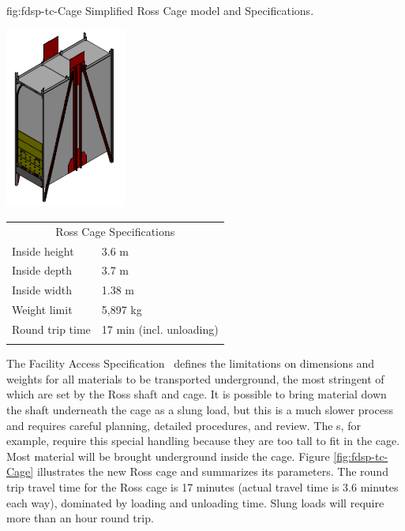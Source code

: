\begin{dunefigure}
{fig:fdsp-tc-Cage}
{Simplified Ross Cage model and Specifications.}
\parbox{2.1in}{\includegraphics[width=0.3\textwidth]{graphics/Cage-view.pdf}}
\qquad\hspace{10pt}
\begin{minipage}{0.5\textwidth}%
\begin{tabular}{p{3.4cm}p{3.4cm}}        
\multicolumn{2}{c}{Ross Cage Specifications}\\ \toprowrule
Inside height & 3.6 m\\ \colhline
Inside depth  & 3.7 m \\ \colhline
Inside width  & 1.38 m \\ \colhline
Weight limit  &  5,897 kg \\ \colhline
Round trip \newline time & 17 min \newline (incl. unloading) \\ \colhline
\end{tabular}
\end{minipage}
\end{dunefigure}

The  Facility Access Specification~\cite{bib:docdb328} defines the limitations on dimensions and weights for all materials to be transported underground, the most stringent of which are set by the Ross shaft and cage. 
It is possible to bring material down the shaft underneath the cage as a slung load, but this is a much slower process and requires careful planning, detailed procedures, and review. 
The  s, for example, require this special handling because they are too tall to fit in the cage. 
Most material will be brought underground inside the cage. Figure \ref{fig:fdsp-tc-Cage} illustrates the new Ross cage and summarizes its parameters.  
The round trip travel time for the Ross cage is 17 minutes (actual travel time is \num{3.6} minutes each way), dominated by loading and unloading time.  
Slung loads will require more than an hour round trip.




